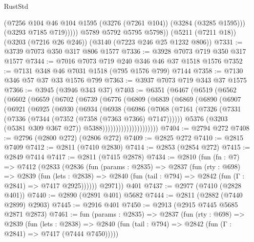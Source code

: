 \begin{lexlean}{RustStd}
\begin{coremodule}
{\begin{coremodule}
{{{{{{{{{{{{{{{                (@7256 @104 @46 @104 @1595 (@3276 (@7261 @104)) (@3284 (@3285 @1595)))
                (@3293 @7185 @719)))))
        @5789
        @5792
        @5795
        @5798))
    (@5211 (@7211 @18))
    (@3203 (@7216 @26 @246))
    (@3140 (@7223 @246 @25 @1232 @806))
@7331 := @3739 @7073 @350 @317 @806 @1577
@7336 := @3928 @7073 @719 @350 @317 @1577
@7344 := @7016 @7073 @719 @240 @346 @46 @37 @1518 @1576
@7352 := @7131 @348 @46 @7031 @1518 (@795 @1576 @799) @7144
@7358 := @7130 @346 @57 @37 @33 @1576 @799
@7363 := @3937 @7073 @719 @343 @37 @1575
@7366 := @3945 (@3946 @343 @37)
@7403 := @6351
    (@6467
      (@6519
        (@6562
          (@6602
            (@6659
              (@6702
                (@6739
                  (@6776
                    (@6809
                      (@6839
                        (@6869
                          (@6890
                            (@6907
                              (@6921
                                (@6925
                                  (@6930
                                    (@6934
                                      (@6938
                                        (@6986
                                          (@7068
                                            (@7161
                                              (@7326
                                                (@7331
                                                  (@7336
                                                    (@7344 (@7352 (@7358 (@7363 @7366) @7147))))))
                                              @5376
                                              (@3203 (@5381 @309 @367 @27))
                                              @5388)))))))))))))))))))))
@7404 := @2794 @272
@7408 := @2796 (@2800 @272) (@2806 @272)
@7409 := @2825 @272
@7410 := @2815 @7409
@7412 := @2811 (@7410 @2830)
@7414 := @2853 (@2854 @272)
@7415 := @2849 @7414
@7417 := @2811 (@7415 @2878)
@7434 := @2810
    (fun (fn : @7) =>
    @7412
      (@2833
        (@2836
          (fun (params : @2835) =>
          @2837
            (fun (rty : @698) =>
            @2839
              (fun (lets : @2838) =>
              @2840 (fun (tail : @794) => @2842 (fun (Γ : @2841) => @7417 @2925))))))
        @2971))
    @401
@7437 := @2977 (@7410 (@2828 @401))
@7440 := @2890 (@2891 @401) @5682
@7444 := @2811 (@2882 (@7440 @2899) @2903)
@7445 := @2916 @401
@7450 := @2913 (@2915 @7445 @5685 @2871 @2873)
@7461 := fun (params : @2835) =>
  @2837
    (fun (rty : @698) =>
    @2839
      (fun (lets : @2838) =>
      @2840 (fun (tail : @794) => @2842 (fun (Γ : @2841) => @7417 (@7444 @7450)))))
}}}}}}}}}}}}}}}
\end{coremodule}}
\end{coremodule}
\end{lexlean}
